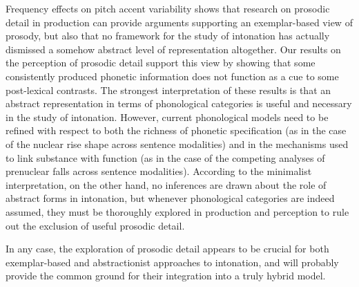 Frequency effects on pitch accent variability shows that research on prosodic detail in production can provide arguments supporting an exemplar-based view of prosody, but also that no framework for the study of intonation has actually dismissed a somehow abstract level of representation altogether. Our results on the perception of prosodic detail support this view by showing that some consistently produced phonetic information does not function as a cue to some post-lexical contrasts. The strongest interpretation of these results is that an abstract representation in terms of phonological categories is useful and necessary in the study of intonation. However, current phonological models need to be refined with respect to both the richness of phonetic specification (as in the case of the nuclear rise shape across sentence modalities) and in the mechanisms used to link substance with function (as in the case of the competing analyses of prenuclear falls across sentence modalities). According to the minimalist interpretation, on the other hand, no inferences are drawn about the role of abstract forms in intonation, but whenever phonological categories are indeed assumed, they must be thoroughly explored in production and perception to rule out the exclusion of useful prosodic detail.

In any case, the exploration of prosodic detail appears to be crucial for both exemplar-based and abstractionist approaches to intonation, and will probably provide the common ground for their integration into a truly hybrid model.